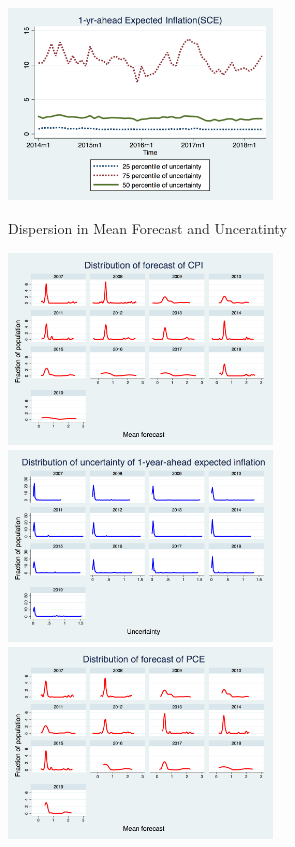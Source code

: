 \documentclass[]{article}
\begin{document}
\begin{figure}[ht]
		\includegraphics[width=7cm]{figures/IQRvarSCEM.png}\\
		\caption{Dispersion in Mean Forecast and Unceratinty }
		\label{IQR_Unceratitny}
	\end{figure}
	
	
	\begin{figure}[ht]
		\centering
		\includegraphics[width=7cm]{figures/PRCCPIMean1_hist.png} 
		\includegraphics[width=7cm]{figures/PRCCPIVar1_hist.png}  \\
		\smallskip
		\includegraphics[width=7cm]{figures/PRCPCEMean1_hist.png} 

\end{figure}
\end{document}

